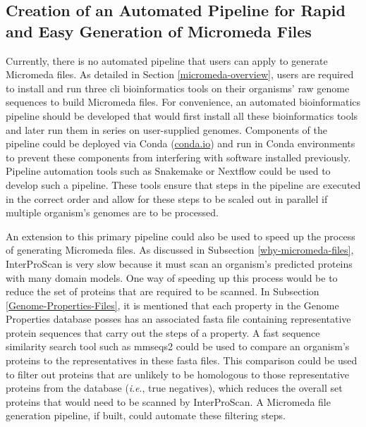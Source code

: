 \subsection{Creation of an Automated Pipeline for Rapid and Easy Generation of 
Micromeda Files} \label{pipeline-development}

Currently, there is no automated pipeline that users can apply to generate 
Micromeda files. As detailed in Section \ref{micromeda-overview}, users are 
required to install and run three \gls{cli} bioinformatics tools on their 
organisms' raw genome sequences to build Micromeda files. For convenience, an 
automated bioinformatics pipeline should be developed that would first install 
all these bioinformatics tools and later run them in series on user-supplied 
genomes. Components of the pipeline could be deployed via Conda 
(\href{http://conda.io}{conda.io}) and run in Conda environments to prevent 
these components from interfering with software installed previously. Pipeline 
automation tools such as Snakemake \cite{koster2012snakemake} or Nextflow 
\cite{di2017nextflow} could be used to develop such a pipeline. These tools 
ensure that steps in the pipeline are executed in the correct order and allow 
for these steps to be scaled out in parallel if multiple organism's genomes are 
to be processed.

An extension to this primary pipeline could also be used to speed up the process 
of generating Micromeda files. As discussed in Subsection 
\ref{why-micromeda-files}, InterProScan is very slow because it must scan an 
organism's predicted proteins with many domain models. One way of speeding up 
this process would be to reduce the set of proteins that are required to be 
scanned. In Subsection \ref{Genome-Properties-Files}, it is mentioned that each 
property in the Genome Properties database posses has an associated \gls{fasta} file 
containing representative protein sequences that carry out the steps of a 
property. A fast sequence similarity search tool such as \gls{mmseqs2} 
\cite{steinegger2017mmseqs2} could be used to compare an organism's proteins to 
the representatives in these \gls{fasta} files. This comparison could be used to 
filter out proteins that are unlikely to be homologous to those representative 
proteins from the database (\textit{i}.\textit{e}., true negatives), which reduces the overall set 
proteins that would need to be scanned by InterProScan. A Micromeda file 
generation pipeline, if built, could automate these filtering steps.

